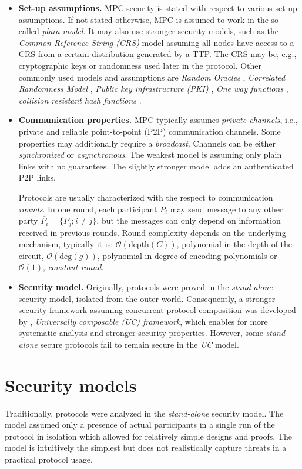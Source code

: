 \documentclass[
  digital, %
  twoside, %
  table,   %
  lof,     %
  lot,     %
]{fithesis3}
\newcommand{\itembf}[1]{\item {\bf{#1}}}
\newcommand{\bigO}[0]{\mathcal{O}}
\newcounter{ph4_show_guides}
\theoremstyle{definition}
\theoremstyle{remark}
\begin{document}
\begin{itemize}
    \itembf{Set-up assumptions.} MPC security is stated with respect to various set-up assumptions. If not stated otherwise, MPC is assumed to work in the so-called \emph{plain model}. It may also use stronger security models, such as the \emph{Common Reference String (CRS)} model \cite{CF01,DN02} assuming all nodes have access to a CRS from a certain distribution generated by a TTP. The CRS may be, e.g., cryptographic keys or randomness used later in the protocol. Other commonly used models and assumptions are \emph{Random Oracles} \cite{HM04}, \emph{Correlated Randomness Model} \cite{FGMR02, FWW04, IKMOP13}, \emph{Public key infrastructure (PKI)} \cite{BCNP04}, \emph{One way functions} \cite{IL89, KL07}, \emph{collision resistant hash functions} \cite{KL07, GMS08}.
    
    \itembf{Communication properties.} MPC typically assumes \emph{private channels}, i.e., private and reliable point-to-point (P2P) communication channels. Some properties may additionally require a \emph{broadcast}. Channels can be either \emph{synchronized} or \emph{asynchronous}. The weakest model is assuming only plain links with no guarantees. The slightly stronger model adds an authenticated P2P links.
    
    Protocols are usually characterized with the respect to communication \emph{rounds}. In one round, each participant $P_i$ may send message to any other party $\overline{P_i} = \{P_j; i \neq j\}$, but the messages can only depend on information received in previous rounds. Round complexity depends on the underlying mechanism, typically it is: $\bigO(\text{depth}(C))$, polynomial in the depth of the circuit, $\bigO(\text{deg}(g))$, polynomial in degree of encoding polynomials or $\bigO(1)$, \emph{constant round}.
    
    \itembf{Security model.} Originally, protocols were proved in the \emph{stand-alone} security model, isolated from the outer world. Consequently, a stronger security framework assuming concurrent protocol composition was developed by \cite{Can01}, \emph{Universally composable (UC) framework}, which enables for more systematic analysis and stronger security properties. However, some \emph{stand-alone} secure protocols fail to remain secure in the \emph{UC} model.
    
\end{itemize}

\section{Security models}\label{sec:uc}%
Traditionally, protocols were analyzed in the \emph{stand-alone} security model. The model assumed only a presence of actual participants in a single run of the protocol in isolation which allowed for relatively simple designs and proofs. The model is intuitively the simplest but does not realistically capture threats in a practical protocol usage. 
\end{document}
